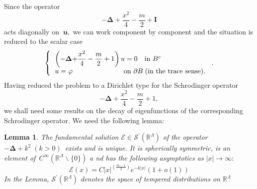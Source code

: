 \documentclass{article}
\newtheorem{lemma}[theorem]{Lemma}
\begin{document}
Since the operator 
\begin{equation}
\mathbf{-\Delta +}\dfrac{x^{2}}{4}-\dfrac{m}{2}+\mathbf{I}
\end{equation}%
acts diagonally on\textbf{\ }$\mathbf{u},$ we can work component by
component and the situation is reduced to the scalar case 
\begin{equation}
\left\{ 
\begin{tabular}{l}
$\left( \mathbf{-\Delta +}\dfrac{x^{2}}{4}-\dfrac{m}{2}+1\right) u=0$ \ \ in 
$B^{c}$ \\ 
$u=\varphi $ \ \ \ \ \ \ \ \ \ \ \ \ \ \ \ \ \ \ \ \ \ on $\partial B\;($in
the trace sense$).$%
\end{tabular}%
\right. .
\end{equation}%
\newline
Having reduced the problem to a Dirichlet type for the Schrodinger operator%
\begin{equation}
\mathbf{-\Delta +}\dfrac{x^{2}}{4}-\dfrac{m}{2}+1,
\end{equation}%
we shall need some results on the decay of eigenfunctions of the
corresponding Schrodinger operator. We need the following lemma:

\begin{lemma}
\textit{The fundamental solution }$\mathcal{E}\in \mathcal{S}^{\prime }(%
\mathbb{R}^{\Lambda })$ \textit{of the operator }$-\mathbf{\Delta }%
+k^{2}\;(k>0)$\textit{\ exists and is unique. It is spherically symmetric,
is an element of}\ $C^{\infty }(\mathbb{R}^{\Lambda }\backslash \{0\})$ a%
\textit{nd has the following asymptotics as }$\left\vert x\right\vert
\rightarrow \infty :$\textit{\ }%
\begin{equation}
\mathcal{E}(x)=C\left\vert x\right\vert ^{\left( \frac{m-1}{2}\right)
}e^{-k\left\vert x\right\vert }(1+o(1))
\end{equation}%
\newline
In the Lemma, $\mathcal{S}^{\prime }(\mathbb{R}^{\Lambda })$ denotes the
space of tempered distributions on $\mathbb{R}^{\Lambda }$
\end{lemma}
\end{document}
